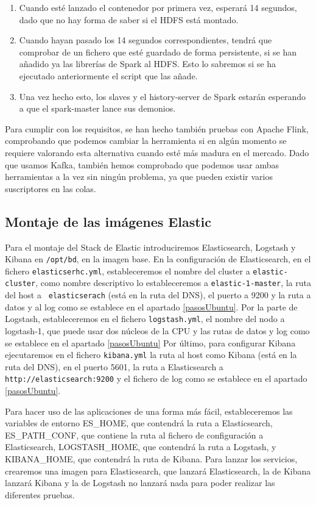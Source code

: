\begin{enumerate}
\item Cuando esté lanzado el contenedor por primera vez, esperará 14
  segundos, dado que no hay forma de saber si el HDFS está montado.
\item Cuando hayan pasado los 14 segundos correspondientes, tendrá que
  comprobar de un fichero que esté guardado de forma persistente, si se han
  añadido ya las librerías de Spark al HDFS. Esto lo sabremos si se ha
  ejecutado anteriormente el script que las añade.
\item Una vez hecho esto, los slaves y el history-server de Spark estarán
  esperando a que el spark-master lance sus demonios.
\end{enumerate}

Para cumplir con los requisitos, se han hecho también pruebas con Apache
Flink, comprobando que podemos cambiar la herramienta si en algún momento
se requiere valorando esta alternativa cuando esté más madura en el
mercado. Dado que usamos Kafka, también hemos comprobado que podemos usar
ambas herramientas a la vez sin ningún problema, ya que pueden existir
varios suscriptores en las colas.


\subsection{Montaje de las imágenes Elastic\label{montElastic}}

Para el montaje del Stack de Elastic introduciremos Elasticsearch, Logstash
y Kibana en {\tt /opt/bd}, en la imagen base. En la configuración de
Elasticsearch, en el fichero {\tt elasticserhc.yml}, estableceremos el
nombre del cluster a {\tt elastic-cluster}, como nombre descriptivo lo
estableceremos a {\tt elastic-1-master}, la ruta del host a {\tt
  elasticserach} (está en la ruta del DNS), el puerto a 9200 y la ruta a
datos y al log como se establece en el apartado \ref{pasosUbuntu}. Por la
parte de Logstash, estableceremos en el fichero {\tt logstash.yml}, el
nombre del nodo a logstash-1, que puede usar dos núcleos de la CPU y las
rutas de datos y log como se establece en el apartado \ref{pasosUbuntu} Por
último, para configurar Kibana ejecutaremos en el fichero {\tt kibana.yml}
la ruta al host como Kibana (está en la ruta del DNS), en el puerto 5601,
la ruta a Elasticsearch a {\tt http://elasticsearch:9200} y el fichero de
log como se establece en el apartado \ref{pasosUbuntu}.

Para hacer uso de las aplicaciones de una forma más fácil, estableceremos
las variables de entorno ES\_HOME, que contendrá la ruta a Elasticsearch,
ES\_PATH\_CONF, que contiene la ruta al fichero de configuración a
Elasticsearch, LOGSTASH\_HOME, que contendrá la ruta a Logstash, y
KIBANA\_HOME, que contendrá la ruta de Kibana. Para lanzar los servicios,
crearemos una imagen para Elasticsearch, que lanzará Elasticsearch, la de
Kibana lanzará Kibana y la de Logstash no lanzará nada para poder realizar
las diferentes pruebas.

